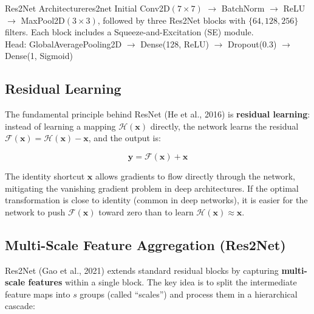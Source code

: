 \documentclass[12pt]{report}
\begin{document}
\begin{tecbox}{Res2Net Architecture}{res2net}
    Initial Conv2D$(7 \times 7)$ $\to$ BatchNorm $\to$ ReLU $\to$ MaxPool2D$(3 \times 3)$,
    followed by three Res2Net blocks with $\{64, 128, 256\}$ filters. Each block includes
    a Squeeze-and-Excitation (SE) module. \\
    Head: GlobalAveragePooling2D $\to$ Dense(128, ReLU) $\to$ Dropout(0.3) $\to$ Dense(1, Sigmoid)
\end{tecbox}

\subsection{Residual Learning}

The fundamental principle behind ResNet (He et al., 2016) is \textbf{residual learning}:
instead of learning a mapping $\mathcal{H}(\bm{x})$ directly, the network learns the
residual $\mathcal{F}(\bm{x}) = \mathcal{H}(\bm{x}) - \bm{x}$, and the output is:

\begin{equation}
    \bm{y} = \mathcal{F}(\bm{x}) + \bm{x}
\end{equation}

The identity shortcut $\bm{x}$ allows gradients to flow directly through the network,
mitigating the vanishing gradient problem in deep architectures. If the optimal transformation
is close to identity (common in deep networks), it is easier for the network to push
$\mathcal{F}(\bm{x})$ toward zero than to learn $\mathcal{H}(\bm{x}) \approx \bm{x}$.

\subsection{Multi-Scale Feature Aggregation (Res2Net)}

Res2Net (Gao et al., 2021) extends standard residual blocks by capturing \textbf{multi-scale
features} within a single block. The key idea is to split the intermediate feature maps into
$s$ groups (called ``scales'') and process them in a hierarchical cascade:
\end{document}
